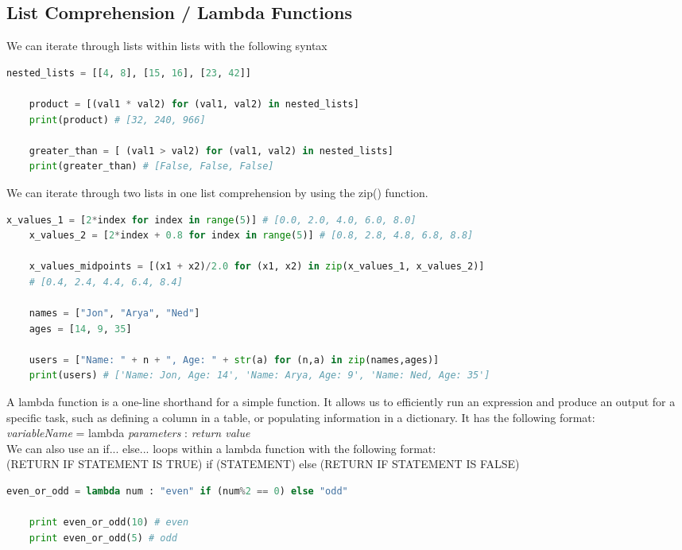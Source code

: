 \documentclass[11pt, a4paper]{article}
\begin{document}
\begin{spacing}{1.1}
	\subsection{List Comprehension / Lambda Functions}
	We can iterate through lists within lists with the following syntax
	\begin{lstlisting}[language=Python]
	nested_lists = [[4, 8], [15, 16], [23, 42]]
	
	product = [(val1 * val2) for (val1, val2) in nested_lists]
	print(product) # [32, 240, 966]	
	
	greater_than = [ (val1 > val2) for (val1, val2) in nested_lists]
	print(greater_than) # [False, False, False] \end{lstlisting}\vspace*{1mm}
	We can iterate through two lists in one list comprehension by using the zip() function.
	\begin{lstlisting}[language=Python]
	x_values_1 = [2*index for index in range(5)] # [0.0, 2.0, 4.0, 6.0, 8.0] 
	x_values_2 = [2*index + 0.8 for index in range(5)] # [0.8, 2.8, 4.8, 6.8, 8.8] 
	
	x_values_midpoints = [(x1 + x2)/2.0 for (x1, x2) in zip(x_values_1, x_values_2)]
	# [0.4, 2.4, 4.4, 6.4, 8.4]	
	
	names = ["Jon", "Arya", "Ned"]
	ages = [14, 9, 35]
	
	users = ["Name: " + n + ", Age: " + str(a) for (n,a) in zip(names,ages)]
	print(users) # ['Name: Jon, Age: 14', 'Name: Arya, Age: 9', 'Name: Ned, Age: 35'] \end{lstlisting}\newpage
	\noindent A lambda function is a one-line shorthand for a simple function. It allows us to efficiently run an expression and produce an output for a specific task, such as defining a column in a table, or populating information in a dictionary. It has the following format: \\
	\textit{variableName} = lambda \textit{parameters} : \textit{return value} \vspace*{2mm} \\
	We can also use an if... else... loops within a lambda function with the following format: \\
	(RETURN IF STATEMENT IS TRUE) if (STATEMENT) else (RETURN IF STATEMENT IS FALSE)
	\begin{lstlisting}[language=Python]
	even_or_odd = lambda num : "even" if (num%2 == 0) else "odd"
	
	print even_or_odd(10) # even
	print even_or_odd(5) # odd 
	

\end{lstlisting}
\end{spacing}
\end{document}
